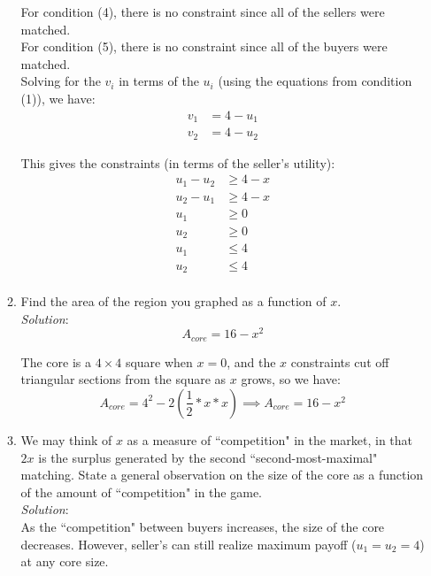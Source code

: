 \documentclass{article}
\begin{document}
\begin{enumerate}
\begin{enumerate}
    For condition (4), there is no constraint since all of the sellers were matched. \\

    For condition (5), there is no constraint since all of the buyers were matched. \\

    Solving for the $v_{i}$ in terms of the $u_{i}$ (using the equations from condition (1)), we have:
    \begin{align*}
    v_{1} &= 4 - u_{1} \\
    v_{2} &= 4 - u_{2}
    \end{align*}

    This gives the constraints (in terms of the seller's utility):
    \begin{align*}
    u_{1} - u_{2} &\ge 4 - x \\
    u_{2} - u_{1} &\ge 4 - x \\
    u_{1}         &\ge 0     \\
    u_{2}         &\ge 0     \\
    u_{1}         &\le 4     \\
    u_{2}         &\le 4     \\
    \end{align*}

    \item Find the area of the region you graphed as a function of $x$. \\

    \textit{Solution}: \\
    \[A_{core} = 16 - x^{2}\]

    The core is a $4 \times 4$ square when $x = 0$, and the $x$ constraints cut off triangular sections from the square as $x$ grows, so we have:
    \[A_{core} = 4^{2} - 2(\frac{1}{2} * x * x) \implies A_{core} = 16 - x^{2}\] 

    \item We may think of $x$ as a measure of ``competition" in the market, in that $2x$ is the surplus generated by the second ``second-most-maximal" matching. State a general observation on the size of the core as a function of the amount of ``competition" in the game. \\

    \textit{Solution}: \\
    
    As the ``competition" between buyers increases, the size of the core decreases. However, seller's can still realize maximum payoff ($u_{1} = u_{2} = 4$) at any core size. \\


\end{enumerate}
\end{enumerate}
\end{document}
